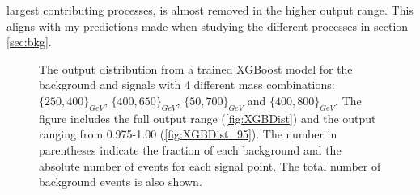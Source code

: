 largest contributing processes, is almost removed in the higher output range. This aligns with my predictions made when studying the 
different processes in section \ref{sec:bkg}. 
\begin{figure}
    \caption[The output distribution from a trained XGBoost model for the background and signals with 4 different mass combination.]{
    The output distribution from a trained XGBoost model for the background and signals with 4 different mass combinations:
    $\{250,400\}_{GeV}$, $\{400,650\}_{GeV}$, $\{50,700\}_{GeV}$ and $\{400,800\}_{GeV}$. 
    The figure includes the full output range (\ref{fig:XGBDist}) and the output ranging from 0.975-1.00 (\ref{fig:XGBDist_95}).
    The number in parentheses indicate the fraction of each background and the absolute number of events for each signal point. 
    The total number of background events is also shown.}
    \label{fig:XGBDistComp}
\end{figure}
